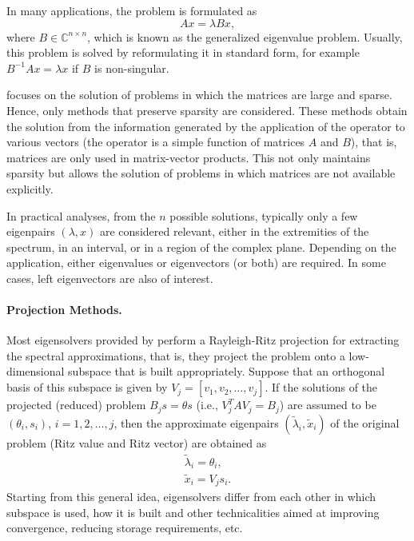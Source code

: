 In many applications, the problem is formulated as
\begin{equation}
Ax=\lambda Bx,\label{eq:eiggen}
\end{equation}
where $B\in\mathbb{C}^{n\times n}$, which is known as the generalized eigenvalue problem. Usually, this problem is solved by reformulating it in standard form, for example $B^{-1}Ax=\lambda x$ if $B$ is non-singular.

\slepc focuses on the solution of problems in which the matrices are large and sparse. Hence, only methods that preserve sparsity are considered.
These methods obtain the solution from the information generated by the application of the operator to various vectors (the operator is a simple function of matrices $A$ and $B$), that is, matrices are only used in matrix-vector products. This not only maintains sparsity but allows the solution of problems in which matrices are not available explicitly.

In practical analyses, from the $n$ possible solutions, typically only a few eigenpairs $(\lambda,x)$ are considered relevant, either in the extremities of the spectrum, in an interval, or in a region of the complex plane.
Depending on the application, either eigenvalues or eigenvectors (or both) are required. In some cases, left eigenvectors are also of interest.

\paragraph{Projection Methods.}

Most eigensolvers provided by \slepc perform a Rayleigh-Ritz projection for extracting the spectral approximations, that is, they project the problem onto a low-dimensional subspace that is built appropriately. Suppose that an orthogonal basis of this subspace is given by $V_j=[v_1,v_2,\ldots,v_j]$. If the solutions of the projected (reduced) problem $B_js=\theta s$ (i.e., $V_j^TAV_j=B_j$) are assumed to be $(\theta_i,s_i)$, $i=1,2,\ldots,j$, then the approximate eigenpairs $(\tilde{\lambda}_i,\tilde{x}_i)$ of the original problem (Ritz value and Ritz vector) are obtained as
\begin{eqnarray}
\tilde{\lambda}_i=\theta_i,\\
\tilde{x}_i=V_js_i.
\end{eqnarray}
Starting from this general idea, eigensolvers differ from each other in which subspace is used, how it is built and other technicalities aimed at improving convergence, reducing storage requirements, etc.


